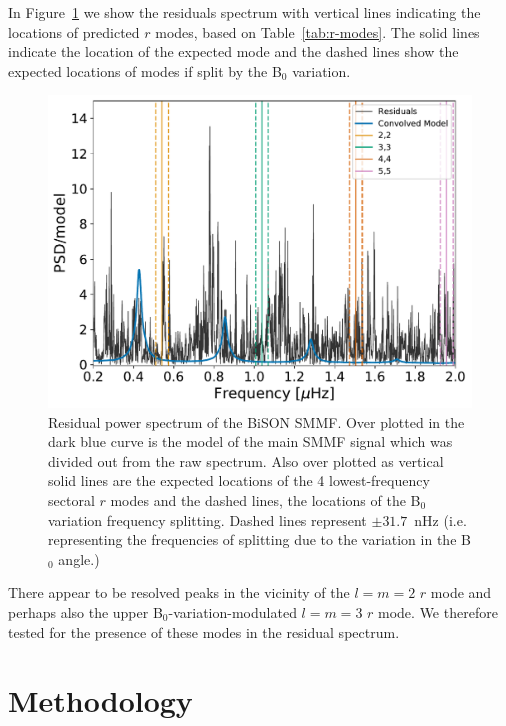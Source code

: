 In Figure~\ref{fig:residuals} we show the residuals spectrum with vertical lines indicating the locations of predicted $r$ modes, based on Table~\ref{tab:r-modes}. The solid lines indicate the location of the expected mode and the dashed lines show the expected locations of modes if split by the B$_0$ variation.


\begin{figure}[!ht]
	\centering
	\includegraphics[width=\columnwidth]{symm_div_r-modes_obs.pdf} 
	\caption{Residual power spectrum of the BiSON SMMF. Over plotted in the dark blue curve is the model of the main SMMF signal which was divided out from the raw spectrum. Also over plotted as vertical solid lines are the expected locations of the 4 lowest-frequency sectoral $r$ modes and the dashed lines, the locations of the B$_0$ variation frequency splitting. Dashed lines represent $\pm 31.7$~nHz (i.e. representing the frequencies of splitting due to the variation in the B$_0$ angle.)}  \label{fig:residuals}
\end{figure}

There appear to be resolved peaks in the vicinity of the $l=m=2$ $r$ mode and perhaps also the upper B$_0$-variation-modulated $l=m=3$ $r$ mode. We therefore tested for the presence of these modes in the residual spectrum.



\section{Methodology}\label{sec:r-mode_method}

